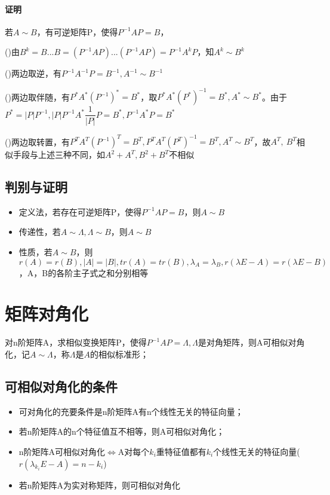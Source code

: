 \paragraph{证明}
若\(A \sim B\)，有可逆矩阵P，使得\(P^{-1}AP = B\)，

()由\(B^k = B...B = (P^{-1}AP)...(P^{-1}AP) = P^{-1}A^kP\)，知\(A^k \sim B^k\)

()两边取逆，有\(P^{-1}A^{-1}P = B^{-1}, A^{-1} \sim B^{-1}\)

()两边取伴随，有\(P^*A^*(P^{-1})^* = B^*\)，取\(P^*A^*(P^*)^{-1} = B^*, A^* \sim B^*\)。由于\(P^* = |P|P^{-1}, |P|P^{-1}A^*\dfrac{1}{|P|}P = B^*, P^{-1}A^*P = B^*\)

()两边取转置，有\(P^TA^T(P^{-1})^T = B^T, P^TA^T(P^T)^{-1} = B^T, A^T \sim B^T\)，故\(A^T,\ B^T\)相似手段与上述三种不同，如\(A^2 + A^T, B^2 + B^T\)不相似



\subsection{判别与证明}
\begin{itemize}
    \item 定义法，若存在可逆矩阵P，使得\(P^{-1}AP = B\)，则\(A \sim B\)
    \item 传递性，若\(A \sim \Lambda, \Lambda \sim B\)，则\(A \sim B\)
    \item 性质，若\(A \sim B\)，则\(r(A) = r(B), |A| = |B|, tr(A) = tr(B), \lambda_A = \lambda_B, r(\lambda E - A) = r(\lambda E - B)\)，A，B的各阶主子式之和分别相等
\end{itemize}


\section{矩阵对角化}
对n阶矩阵A，求相似变换矩阵P，使得\(P^{-1}AP = \Lambda, \Lambda\)是对角矩阵，则A可相似对角化，记\(A \sim \Lambda\)，称\(\Lambda\)是\(A\)的相似标准形；

\subsection{可相似对角化的条件}
\begin{itemize}
    \item 可对角化的充要条件是n阶矩阵A有n个线性无关的特征向量；
    \item 若n阶矩阵A的n个特征值互不相等，则A可相似对角化；
    \item n阶矩阵A可相似对角化\(\Leftrightarrow\)A对每个\(k_i\)重特征值都有\(k_i\)个线性无关的特征向量(\(r(\lambda_{k_i}E - A) = n - k_i\))
    \item 若n阶矩阵A为实对称矩阵，则可相似对角化
\end{itemize}

